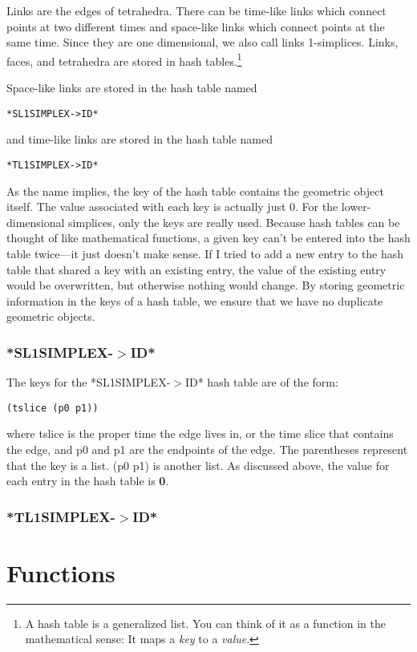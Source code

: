 \documentclass[12pt]{article}
\begin{document}
Links are the edges of tetrahedra. There can be time-like links which
connect points at two different times and space-like links which
connect points at the same time. Since they are one dimensional, we
also call links 1-simplices. Links, faces, and tetrahedra are stored
in hash tables.\footnote{A hash table is a generalized list. You can
  think of it as a function in the mathematical sense: It maps a
  \textit{key} to a \textit{value}.} 

Space-like links are stored in the hash table named
\begin{lstlisting}
*SL1SIMPLEX->ID*
\end{lstlisting}
and time-like links are stored in the hash table named
\begin{lstlisting}
*TL1SIMPLEX->ID*
\end{lstlisting}

As the name implies, the key of the hash table contains the geometric
object itself. The value associated with each key is actually just
0. For the lower-dimensional simplices, only the keys are really
used. Because hash tables can be thought of like mathematical
functions, a given key can't be entered into the hash table twice---it
just doesn't make sense. If I tried to add a new entry to the hash
table that shared a key with an existing entry, the value of the
existing entry would be overwritten, but otherwise nothing would
change. By storing geometric information in the keys of a hash table,
we ensure that we have no duplicate geometric objects.

\subsubsection{*SL1SIMPLEX-$>$ID*}
\label{sss:sl1simplex:id}
The keys for the *SL1SIMPLEX-$>$ID* hash table are of the form:
\begin{lstlisting}
(tslice (p0 p1))
\end{lstlisting}
where tslice is the proper time the edge lives in, or the time slice
that contains the edge, and p0 and p1 are the endpoints of the
edge. The parentheses represent that the key is a list. (p0 p1) is
another list. As discussed above, the value for each entry in the hash table is \textbf{0}.

\subsubsection{*TL1SIMPLEX-$>$ID*}
\label{sss:tl1simplex:id}

\section{Functions}
\label{s:functions}
\end{document}
